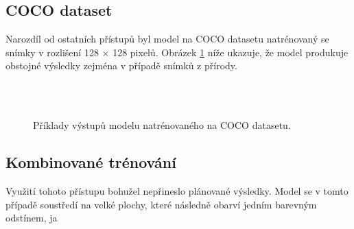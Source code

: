 \documentclass[12pt, a4paper]{article}
\begin{document}
    \subsection{COCO dataset}\label{results:coco}
    Narozdíl od ostatních přístupů byl model na COCO datasetu natrénovaný se snímky v rozlišení 128 $\times$ 128 pixelů. Obrázek \ref{fig:res_coco} níže ukazuje, že model produkuje obstojné výsledky zejména v případě snímků z přírody.
    
    \begin{figure}[ht]
        \centering
        \hspace{4pt}\\\vspace{4pt}
        \hspace{4pt}\\\vspace{4pt}
        \hspace{4pt}
        
        \caption{Příklady výstupů modelu natrénovaného na COCO datasetu.}
        \label{fig:res_coco}
    \end{figure}
    
    \subsection{Kombinované trénování}\label{results:combine}
    Využití tohoto přístupu bohužel nepřineslo plánované výsledky. Model se v tomto případě soustředí na velké plochy, které následně obarví jedním barevným odstínem, ja
\end{document}
